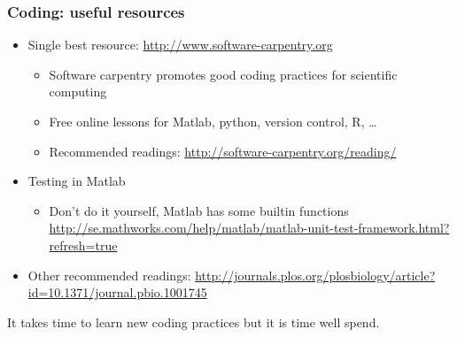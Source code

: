 \documentclass[screen, aspectratio=43]{beamer}
\begin{document}
\begin{frame}
  \frametitle{Coding: useful resources}
  \begin{itemize}
  \item Single best resource: \url{http://www.software-carpentry.org}
    \begin{itemize}
    \item Software carpentry promotes good coding practices for scientific computing
    \item Free online lessons for Matlab, python, version control, R, \ldots
    \item Recommended readings: \url{http://software-carpentry.org/reading/}
    \end{itemize}
  \item Testing in Matlab
    \begin{itemize}
    \item Don't do it yourself, Matlab has some builtin functions \url{http://se.mathworks.com/help/matlab/matlab-unit-test-framework.html?refresh=true}
    \end{itemize}
  \item Other recommended readings: \url{http://journals.plos.org/plosbiology/article?id=10.1371/journal.pbio.1001745}
  \end{itemize}
It takes time to learn new coding practices but it is time well spend.
\end{frame}
\end{document}
